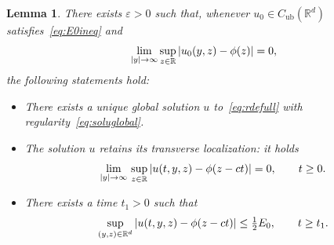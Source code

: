\documentclass[12pt,oneside,a4paper,reqno]{amsart}
\numberwithin{equation}{section}
\newtheorem{lemma}[theorem]{Lemma}
\theoremstyle{definition}
\theoremstyle{remark}
\newcommand{\bbR}{{\mathbb R}}
\newcommand{\eps}{\varepsilon}
\newcommand{\Cub}{{C_{\mathrm{ub}}}}
\DeclarePairedDelimiter{\abs}{\lvert}{\rvert}
\begin{document}
\begin{lemma}
    \label{lem:decayiterate}
    There exists $\eps > 0$ such that, whenever  $u_0 \in \Cub(\bbR^d)$ satisfies~\eqref{eq:E0ineq} and
    \begin{equation*}
		\lim_{\abs{y} \to \infty} \sup_{z \in \bbR}\, \abs{u_0(y,z) - \phi(z)} = 0,
	\end{equation*}
    the following statements hold:
    \begin{itemize}
        \item There exists a unique global solution $u$ to~\eqref{eq:rdefull} with regularity~\eqref{eq:soluglobal}.
        \item The solution $u$ retains its transverse localization: it holds
        \begin{equation}
            \label{eq:preservedecay}
            \lim_{\abs{y} \to \infty} \, \sup_{z \in \bbR}\, \abs{u(t,y,z) - \phi(z - ct)} = 0, \qquad t \geq 0.
        \end{equation}
        \item There exists a time $t_1 > 0$ such that
        \begin{equation}
            \label{eq:decayconvergence}
            \sup_{(y,z) \in \bbR^d} \, \abs{u(t,y,z) - \phi(z - ct)} \leq \tfrac{1}{2} E_0, \qquad t \geq t_1.
        \end{equation}
    \end{itemize}
\end{lemma}
\end{document}
